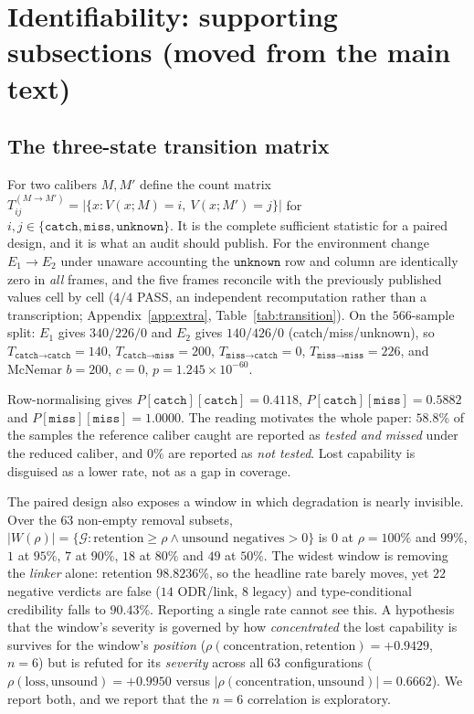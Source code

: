 \documentclass{article}
\newcommand{\calG}{\mathcal{G}}
\newcommand{\catch}{\texttt{catch}}
\newcommand{\miss}{\texttt{miss}}
\newcommand{\unk}{\texttt{unknown}}
\begin{document}



\section{Identifiability: supporting subsections (moved from the main text)}
\label{app:identsupport}
\subsection{The three-state transition matrix}
\label{sec:transition}

For two calibers $M,M'$ define the count matrix
$T^{(M\to M')}_{ij}=|\{x: V(x;M)=i,\ V(x;M')=j\}|$ for $i,j\in\{\catch,\miss,\unk\}$. It is the complete
sufficient statistic for a paired design, and it is what an audit should publish. For the environment change
$E_1\to E_2$ under unaware accounting the $\unk$ row and column are identically zero in \emph{all} frames,
and the five frames reconcile with the previously published values cell by cell ($4/4$ PASS, an independent
recomputation rather than a transcription; Appendix~\ref{app:extra}, Table~\ref{tab:transition}). On the
$566$-sample split: $E_1$ gives $340/226/0$ and $E_2$ gives $140/426/0$ (catch/miss/unknown), so
$T_{\catch\to\catch}=140$, $T_{\catch\to\miss}=200$, $T_{\miss\to\catch}=0$, $T_{\miss\to\miss}=226$, and
McNemar $b=200$, $c=0$, $p=1.245\times10^{-60}$.

Row-normalising gives $P[\catch][\catch]=0.4118$, $P[\catch][\miss]=0.5882$ and $P[\miss][\miss]=1.0000$.
The reading motivates the whole paper: $58.8\%$ of the samples the reference caliber caught are reported as
\emph{tested and missed} under the reduced caliber, and $0\%$ are reported as \emph{not tested}. Lost
capability is disguised as a lower rate, not as a gap in coverage.

The paired design also exposes a window in which degradation is nearly invisible. Over the $63$ non-empty
removal subsets, $|W(\rho)|=\{\calG: \text{retention}\ge\rho\wedge\text{unsound negatives}>0\}$ is $0$ at
$\rho=100\%$ and $99\%$, $1$ at $95\%$, $7$ at $90\%$, $18$ at $80\%$ and $49$ at $50\%$. The widest window
is removing the \emph{linker} alone: retention $98.8236\%$, so the headline rate barely moves, yet $22$
negative verdicts are false ($14$ ODR/link, $8$ legacy) and type-conditional credibility falls to
$90.43\%$. Reporting a single rate cannot see this. A hypothesis that the window's severity is governed by
how \emph{concentrated} the lost capability is survives for the window's \emph{position}
($\rho(\text{concentration},\text{retention})=+0.9429$, $n=6$) but is refuted for its \emph{severity} across
all $63$ configurations ($\rho(\text{loss},\text{unsound})=+0.9950$ versus
$|\rho(\text{concentration},\text{unsound})|=0.6662$). We report both, and we report that the $n=6$
correlation is exploratory.
\end{document}
